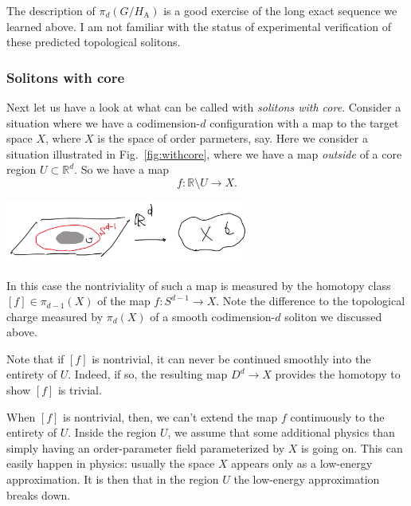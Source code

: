 \documentclass[12pt]{article}
\numberwithin{equation}{section}
\renewenvironment{figure}[1][]{
  \begin{originalfigure}[#1]
    \begin{mdframed}[linecolor=black!0,backgroundcolor=black!1]
}{
    \end{mdframed}
  \end{originalfigure}
}
\def\bR{\mathbb{R}}
\begin{document}
The description of $\pi_d(G/H_\text{A})$ is a good exercise of the long exact sequence we learned above.
I am not familiar with the status of experimental verification of these predicted topological solitons.

\subsubsection{Solitons with core}

Next let us have a look at what can be called with \emph{solitons with core}.
Consider a situation where we have a codimension-$d$ configuration
with a map to the target space $X$, where $X$ is the space of order parmeters, say.
Here we consider a situation illustrated in Fig.~\ref{fig:withcore},
where we have a map \emph{outside} of a core region $U\subset \bR^d$.
So we have a map \begin{equation}
f: \bR\setminus  U \to X.
\end{equation}

\begin{figure}[h]
\centering
  \includegraphics[width=0.6\textwidth]{withcore.png}
  \caption{A codimension-$d$ configuration with `core', given by a map $S^{d-1}\to X$. }
  \label{fig:withcore}
\end{figure}

In this case the nontriviality of such a map is measured by the homotopy class $[f]\in \pi_{d-1}(X)$
of the map $f: S^{d-1}\to X$.
Note the difference to the topological charge measured by  $\pi_d(X)$ of a smooth codimension-$d$ soliton
we discussed above.

Note that if $[f]$ is nontrivial,
it can never be continued smoothly into the entirety of $U$.
Indeed, if so, the resulting map $D^{d}\to X$ provides the homotopy to show $[f]$ is trivial.

When $[f]$ is nontrivial, then, we can't extend the map $f$ continuously to the entirety of $U$.
Inside the region $U$, we assume that some additional physics than 
simply having an order-parameter field parameterized by $X$ is going on.
This can easily happen in physics: usually the space $X$ appears only as a low-energy approximation.
It is then  that in the region $U$ the low-energy approximation breaks down.
\end{document}
